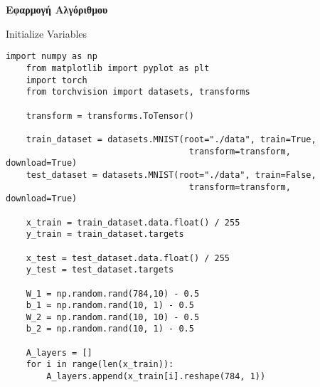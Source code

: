 \documentclass[a4paper,12pt]{article}
\begin{document}

\newpage
\section*{}
\begin{center}
    \Large \textbf{Εφαρμογή Αλγόριθμου}
\end{center}

\setlength{\floatsep}{10pt}
\setlength{\textfloatsep}{10pt}
\setlength{\intextsep}{10pt}

\begin{algorithm}[H]
    \caption{Initialize Variables}
    \begin{lstlisting}[style=pythonstyle]
    import numpy as np
    from matplotlib import pyplot as plt
    import torch
    from torchvision import datasets, transforms
    
    transform = transforms.ToTensor()
    
    train_dataset = datasets.MNIST(root="./data", train=True, 
                                    transform=transform, download=True)
    test_dataset = datasets.MNIST(root="./data", train=False, 
                                    transform=transform, download=True)
    
    x_train = train_dataset.data.float() / 255
    y_train = train_dataset.targets
    
    x_test = test_dataset.data.float() / 255
    y_test = test_dataset.targets
    
    W_1 = np.random.rand(784,10) - 0.5
    b_1 = np.random.rand(10, 1) - 0.5 
    W_2 = np.random.rand(10, 10) - 0.5
    b_2 = np.random.rand(10, 1) - 0.5
    
    A_layers = []
    for i in range(len(x_train)):
        A_layers.append(x_train[i].reshape(784, 1))
    \end{lstlisting}
    \end{algorithm}
    
\end{document}
